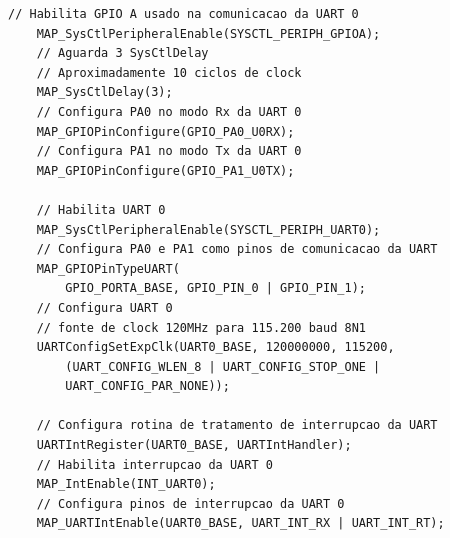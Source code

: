 \begin{lstlisting}[style=citacao]
	// Habilita GPIO A usado na comunicacao da UART 0
	MAP_SysCtlPeripheralEnable(SYSCTL_PERIPH_GPIOA);
	// Aguarda 3 SysCtlDelay
	// Aproximadamente 10 ciclos de clock
	MAP_SysCtlDelay(3);
	// Configura PA0 no modo Rx da UART 0
	MAP_GPIOPinConfigure(GPIO_PA0_U0RX);
	// Configura PA1 no modo Tx da UART 0
	MAP_GPIOPinConfigure(GPIO_PA1_U0TX);

	// Habilita UART 0
	MAP_SysCtlPeripheralEnable(SYSCTL_PERIPH_UART0);
	// Configura PA0 e PA1 como pinos de comunicacao da UART
	MAP_GPIOPinTypeUART(
		GPIO_PORTA_BASE, GPIO_PIN_0 | GPIO_PIN_1);
	// Configura UART 0
	// fonte de clock 120MHz para 115.200 baud 8N1
	UARTConfigSetExpClk(UART0_BASE, 120000000, 115200,
		(UART_CONFIG_WLEN_8 | UART_CONFIG_STOP_ONE | 
		UART_CONFIG_PAR_NONE));

	// Configura rotina de tratamento de interrupcao da UART
	UARTIntRegister(UART0_BASE, UARTIntHandler);
	// Habilita interrupcao da UART 0
	MAP_IntEnable(INT_UART0);
	// Configura pinos de interrupcao da UART 0
	MAP_UARTIntEnable(UART0_BASE, UART_INT_RX | UART_INT_RT);
\end{lstlisting}


